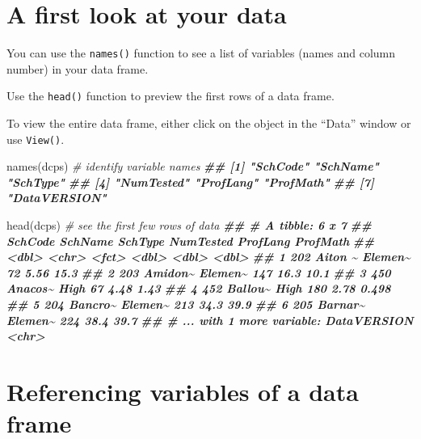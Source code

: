 \documentclass[
  12pt,
]{krantz}
\newenvironment{Shaded}{\begin{snugshade}}{\end{snugshade}}
\newcommand{\CommentTok}[1]{\textcolor[rgb]{0.56,0.35,0.01}{\textit{#1}}}
\newcommand{\DocumentationTok}[1]{\textcolor[rgb]{0.56,0.35,0.01}{\textbf{\textit{#1}}}}
\newcommand{\FunctionTok}[1]{\textcolor[rgb]{0.00,0.00,0.00}{#1}}
\newcommand{\NormalTok}[1]{#1}
\begin{document}
\hypertarget{a-first-look-at-your-data}{%
\section{A first look at your data}\label{a-first-look-at-your-data}}

You can use the \texttt{names()} function to see a list of variables (names and column number) in your data frame.

Use the \texttt{head()} function to preview the first rows of a data frame.

To view the entire data frame, either click on the object in the ``Data'' window or use \texttt{View()}.

\begin{Shaded}
\begin{Highlighting}[]
  \FunctionTok{names}\NormalTok{(dcps)  }\CommentTok{\# identify variable names}
\DocumentationTok{\#\# [1] "SchCode"     "SchName"     "SchType"    }
\DocumentationTok{\#\# [4] "NumTested"   "ProfLang"    "ProfMath"   }
\DocumentationTok{\#\# [7] "DataVERSION"}

  \FunctionTok{head}\NormalTok{(dcps)   }\CommentTok{\# see the first few rows of data}
\DocumentationTok{\#\# \# A tibble: 6 x 7}
\DocumentationTok{\#\#   SchCode SchName SchType NumTested ProfLang ProfMath}
\DocumentationTok{\#\#     \textless{}dbl\textgreater{} \textless{}chr\textgreater{}   \textless{}fct\textgreater{}       \textless{}dbl\textgreater{}    \textless{}dbl\textgreater{}    \textless{}dbl\textgreater{}}
\DocumentationTok{\#\# 1     202 Aiton \textasciitilde{} Elemen\textasciitilde{}        72     5.56   15.3  }
\DocumentationTok{\#\# 2     203 Amidon\textasciitilde{} Elemen\textasciitilde{}       147    16.3    10.1  }
\DocumentationTok{\#\# 3     450 Anacos\textasciitilde{} High           67     4.48    1.43 }
\DocumentationTok{\#\# 4     452 Ballou\textasciitilde{} High          180     2.78    0.498}
\DocumentationTok{\#\# 5     204 Bancro\textasciitilde{} Elemen\textasciitilde{}       213    34.3    39.9  }
\DocumentationTok{\#\# 6     205 Barnar\textasciitilde{} Elemen\textasciitilde{}       224    38.4    39.7  }
\DocumentationTok{\#\# \# ... with 1 more variable: DataVERSION \textless{}chr\textgreater{}}
\end{Highlighting}
\end{Shaded}

\hypertarget{referencing-variables-of-a-data-frame}{%
\section{Referencing variables of a data frame}\label{referencing-variables-of-a-data-frame}}
\end{document}
